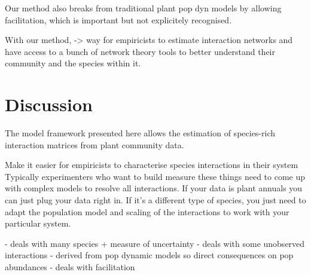 \documentclass[a4,12pt]{article}
\begin{document}
    Our method also breaks from traditional plant pop dyn models by allowing facilitation, which is important but not explicitely recognised.

    With our method, -> way for empiricists to estimate interaction networks and have access to a bunch of network theory tools to better understand their community and the species within it. 









\section{Discussion}

    
    The model framework presented here allows the estimation of species-rich interaction matrices from plant community data. 

    Make it easier for empiricists to characterise species interactions in their system
    Typically experimenters who want to build measure these things need to come up with complex models to resolve all interactions. If your data is plant annuals you can just plug your data right in. If it's a different type of species, you just need to adapt the population model and scaling of the interactions to work with your particular system. 

    - deals with many species + measure of uncertainty
    - deals with some unobserved interactions
    - derived from pop dynamic models so direct consequences on pop abundances
    - deals with facilitation 
\end{document}
